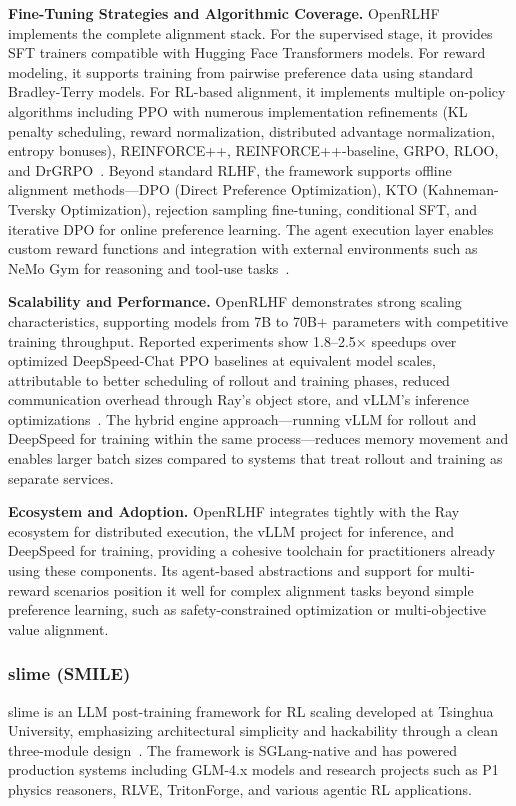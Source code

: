 \documentclass[conference]{IEEEtran}
\begin{document}
\textbf{Fine-Tuning Strategies and Algorithmic Coverage.} OpenRLHF implements the complete alignment stack. For the supervised stage, it provides SFT trainers compatible with Hugging Face Transformers models. For reward modeling, it supports training from pairwise preference data using standard Bradley-Terry models. For RL-based alignment, it implements multiple on-policy algorithms including PPO with numerous implementation refinements (KL penalty scheduling, reward normalization, distributed advantage normalization, entropy bonuses), REINFORCE++, REINFORCE++-baseline, GRPO, RLOO, and DrGRPO~\cite{openrlhf-paper}. Beyond standard RLHF, the framework supports offline alignment methods—DPO (Direct Preference Optimization), KTO (Kahneman-Tversky Optimization), rejection sampling fine-tuning, conditional SFT, and iterative DPO for online preference learning. The agent execution layer enables custom reward functions and integration with external environments such as NeMo Gym for reasoning and tool-use tasks~\cite{openrlhf-paper}.

\textbf{Scalability and Performance.} OpenRLHF demonstrates strong scaling characteristics, supporting models from 7B to 70B+ parameters with competitive training throughput. Reported experiments show 1.8–2.5× speedups over optimized DeepSpeed-Chat PPO baselines at equivalent model scales, attributable to better scheduling of rollout and training phases, reduced communication overhead through Ray's object store, and vLLM's inference optimizations~\cite{openrlhf-paper}. The hybrid engine approach—running vLLM for rollout and DeepSpeed for training within the same process—reduces memory movement and enables larger batch sizes compared to systems that treat rollout and training as separate services.

\textbf{Ecosystem and Adoption.} OpenRLHF integrates tightly with the Ray ecosystem for distributed execution, the vLLM project for inference, and DeepSpeed for training, providing a cohesive toolchain for practitioners already using these components. Its agent-based abstractions and support for multi-reward scenarios position it well for complex alignment tasks beyond simple preference learning, such as safety-constrained optimization or multi-objective value alignment.


\subsubsection{slime (SMILE)}

slime is an LLM post-training framework for RL scaling developed at Tsinghua University, emphasizing architectural simplicity and hackability through a clean three-module design~\cite{slime-github, slime-blog}. The framework is SGLang-native and has powered production systems including GLM-4.x models and research projects such as P1 physics reasoners, RLVE, TritonForge, and various agentic RL applications.
\end{document}
